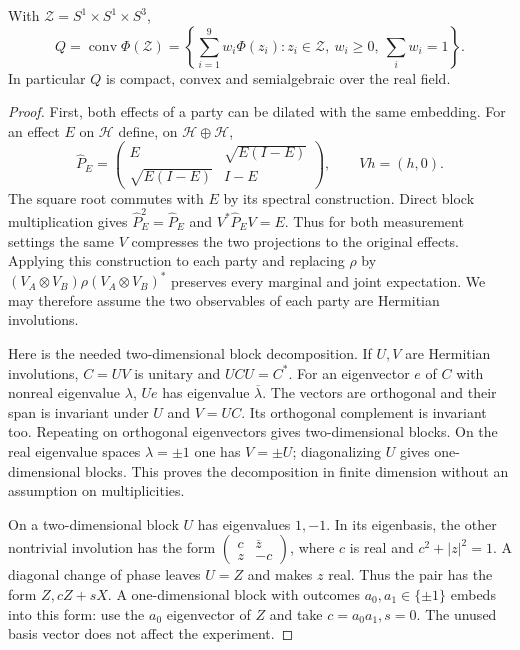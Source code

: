 \begin{theorem}
With $\mathcal Z=S^1\times S^1\times S^3$,
\[
 Q=\operatorname{conv}\Phi(\mathcal Z)
   =\left\{\sum_{i=1}^{9}w_i\Phi(z_i):
       z_i\in\mathcal Z,\ w_i\geq0,\ \sum_iw_i=1\right\}.
 \tag{RFA3}
\]
In particular $Q$ is compact, convex and semialgebraic over the real field.
\end{theorem}

\begin{proof}
First, both effects of a party can be dilated with the same embedding.
For an effect $E$ on $\mathcal H$ define, on $\mathcal H\oplus\mathcal H$,
\[
 \widehat P_E=
 \begin{pmatrix}E&\sqrt{E(I-E)}\\
                 \sqrt{E(I-E)}&I-E\end{pmatrix},
 \qquad Vh=(h,0).
 \tag{RFA4}
\]
The square root commutes with $E$ by its spectral construction. Direct
block multiplication gives $\widehat P_E^2=\widehat P_E$ and
$V^*\widehat P_EV=E$. Thus for both measurement settings the same $V$
compresses the two projections to the original effects. Applying this
construction to each party and replacing $\rho$ by
$(V_A\otimes V_B)\rho(V_A\otimes V_B)^*$ preserves every marginal and
joint expectation. We may therefore assume the two observables of each
party are Hermitian involutions.

Here is the needed two-dimensional block decomposition. If $U,V$ are
Hermitian involutions, $C=UV$ is unitary and $UCU=C^*$. For an eigenvector
$e$ of $C$ with nonreal eigenvalue $\lambda$, $Ue$ has eigenvalue
$\overline\lambda$. The vectors are orthogonal and their span is invariant
under $U$ and $V=UC$. Its orthogonal complement is invariant too. Repeating
on orthogonal eigenvectors gives two-dimensional blocks. On the real
eigenvalue spaces $\lambda=\pm1$ one has $V=\pm U$; diagonalizing $U$ gives
one-dimensional blocks. This proves the decomposition in finite dimension
without an assumption on multiplicities.

On a two-dimensional block $U$ has eigenvalues $1,-1$. In its eigenbasis,
the other nontrivial involution has the form
$\left(\begin{smallmatrix}c&\overline z\\z&-c\end{smallmatrix}\right)$,
where $c$ is real and $c^2+|z|^2=1$. A diagonal change of phase leaves
$U=Z$ and makes $z$ real. Thus the pair has the form $Z,cZ+sX$.
A one-dimensional block with outcomes $a_0,a_1\in\{\pm1\}$ embeds into
this form: use the $a_0$ eigenvector of $Z$ and take
$c=a_0a_1,s=0$. The unused basis vector does not affect the experiment.


\end{proof}
